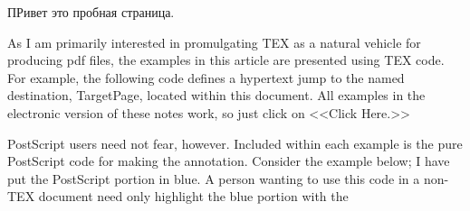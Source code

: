 \newpage
ПРивет это пробная страница.



As I am primarily interested in promulgating TEX as a natural vehicle
for producing pdf files, the examples in this article are presented using
TEX code. For example, the following code defines a hypertext jump
to the named destination, TargetPage, located within this document.
All examples in the electronic version of these notes work, so just click
on <<Click Here.>>

\leavevmode{}\special{ps: %
[ /Rect \Rect %
/Border [ 0 0 0 ]
/Action /GoTo
/Dest /TargetPage
/Subtype /Link
/ANN pdfmark}\unhbox\bbox

PostScript users need not fear, however. Included within each example
is the pure PostScript code for making the annotation. Consider the
example below; I have put the PostScript portion in blue. A person
wanting to use this code in a non-TEX document need only highlight
the blue portion with the
